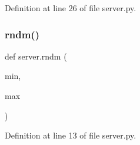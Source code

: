 Definition at line 26 of file server.\+py.

\mbox{\label{namespaceserver_a3b3450e25776d7cb706ea4f6abf78ace}} 
\subsubsection{\texorpdfstring{rndm()}{rndm()}}
{\footnotesize\ttfamily def server.\+rndm (\begin{DoxyParamCaption}\item[{}]{min,  }\item[{}]{max }\end{DoxyParamCaption})}



Definition at line 13 of file server.\+py.

